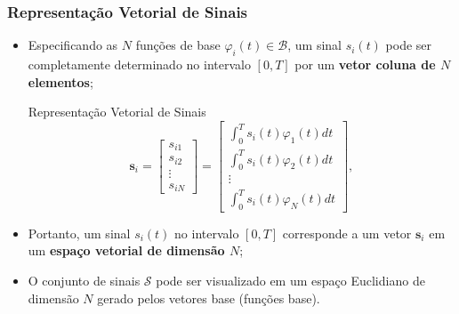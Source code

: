 \documentclass{beamer}
\newcommand{\pag}[1] {\begin{frame}#1\end{frame}}
\begin{document}
\pag{
	\frametitle{Representação Vetorial de Sinais}
	\begin{itemize}
		\item Especificando as $N$ funções de base $\varphi_{i}(t) \in \mathcal{B}$, um sinal $s_{i}(t)$ pode ser completamente determinado no intervalo $[0,T]$ por um \textbf{vetor coluna de $N$ elementos};
		\begin{block}{Representação Vetorial de Sinais}
			\begin{equation}
				\mathbf{s}_{i} = \begin{bmatrix}
			       s_{i1} \\[0.5em]
			       s_{i2} \\[0.5em]
			       \vdots \\[0.5em]
			       s_{iN}
			     \end{bmatrix} = \begin{bmatrix}
			       \int_{0}^{T}s_{i}(t)\varphi_{1}(t)dt \\[0.5em]
			       \int_{0}^{T}s_{i}(t)\varphi_{2}(t)dt \\[0.5em]
			       \vdots \\[0.5em]
			       \int_{0}^{T}s_{i}(t)\varphi_{N}(t)dt
			     \end{bmatrix},
			\end{equation}
		\end{block}
		\item Portanto, um sinal $s_{i}(t)$ no intervalo $[0,T]$ corresponde a um vetor $\mathbf{s}_{i}$ em um \textbf{espaço vetorial de dimensão $N$};
		\item O conjunto de sinais $\mathcal{S}$ pode ser visualizado em um espaço Euclidiano de dimensão $N$ gerado pelos vetores base (funções base).
	\end{itemize}		
}
\end{document}
